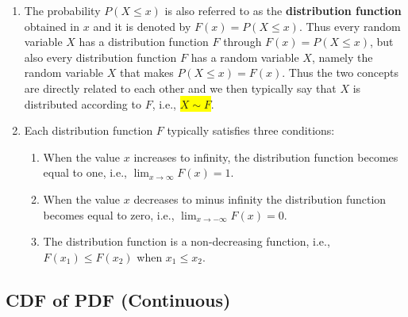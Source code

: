 \begin{enumerate}
    \item The probability $P(X \leq x)$ is also referred to as the \textbf{distribution function} obtained in $x$ and it is denoted by $F(x) = P(X \leq x)$. 
    Thus every random variable $X$ has a distribution function $F$ through $F(x) = P(X \leq x)$, but also every distribution function $F$ has a random variable $X$, namely the random variable $X$ that makes $P(X \leq x) = F(x)$.
    Thus the two concepts are directly related to each other and we then typically say that $X$ is distributed according to $F$, i.e., \colorbox{yellow}{$X \sim F$}.
    \hfill \cite{statistics/book/Statistics-for-Data-Scientists/Maurits-Kaptein}

    \item Each distribution function $F$ typically satisfies three conditions:
    \begin{enumerate}
        \item When the value $x$ increases to infinity, the distribution function becomes equal to one, i.e., $\lim _{x\to \infty} F(x) = 1$. 
        \hfill \cite{statistics/book/Statistics-for-Data-Scientists/Maurits-Kaptein}

        \item When the value $x$ decreases to minus infinity the distribution function becomes equal to zero, i.e., $\lim _{x\to -\infty} F(x) = 0$. 
        \hfill \cite{statistics/book/Statistics-for-Data-Scientists/Maurits-Kaptein}

        \item The distribution function is a non-decreasing function, i.e., $F(x_1) \leq F(x_2)$ when $x_1 \leq x_2$.
        \hfill \cite{statistics/book/Statistics-for-Data-Scientists/Maurits-Kaptein}
    \end{enumerate}


\end{enumerate}


\subsection{CDF of PDF (Continuous)}



